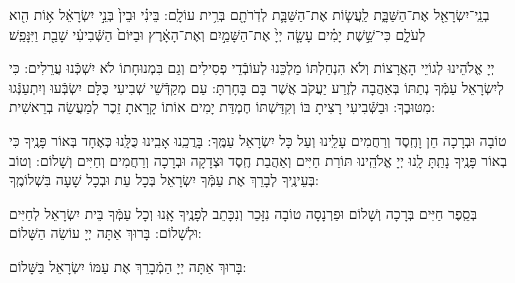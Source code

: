 \documentclass[twoside, openany, parskip=half, 11pt]{book}
\begin{document}
\nextpage
 
  בְנֵֽי־יִשְׂרָאֵ֖ל אֶת־הַשַּׁבָּ֑ת לַֽעֲשׂ֧וֹת אֶת־הַשַּׁבָּ֛ת לְדֹֽרֹתָ֖ם בְּרִ֥ית עוֹלָֽם: בֵּינִ֗י וּבֵין֙ בְּנֵ֣י יִשְׂרָאֵ֔ל א֥וֹת הִ֖וא לְעֹלָ֑ם כִּי־שֵׁ֣שֶׁת יָמִ֗ים עָשָׂ֤ה יְיָ֙ אֶת־הַשָּׁמַ֣יִם וְאֶת־הָאָ֔רֶץ וּבַיּוֹם֙ הַשְּֿׁבִיעִ֔י שָׁבַ֖ת וַיִּנָּפַֽשׁ׃
  
 יְיָ אֱלֹהֵינוּ לְגוֹיֵי הָאֲרָצוֹת וְלֹא הִנְחַלְתּוֹ מַלְכֵּנוּ לְעוֹבְֿדֵי פְסִילִים וְגַם בִּמְנוּחָתוֹ לֹא יִשְׁכְּֿנוּ עֲרֵלִים: כִּי לְיִשְׂרָאֵל עַמְּֿךָ נְתַתּוֹ בְּאַהֲבָה לְזֶרַע יַעֲקֹב אֲשֶׁר בָּם בָּחָרְתָּ: עַם מְקַדְּֿשֵׁי שְׁבִיעִי כֻּלָּם יִשְׂבְּֿעוּ וְיִתְעַנְּֿגוּ מִטּוּבֶךָ: וּבַשְּֿׁבִיעִי רָצִיתָ בּוֹ וְקִדַּשְׁתּוֹ חֶמְדַּת יָמִים אוֹתוֹ קָרָאתָ זֵכֶר לְמַעֲשֵׂה בְרֵאשִׁית:
  
\shabboskiddushhayom

\retzeh

\yaalehveyavo

\zion

\modim

\shabboschanukah

\shabboshodos  


\newcommand{\shabbossimshalom}{
\firstword{שִׂים שָׁלוֹם}
 טוֹבָה וּבְרָכָה חֵן וָחֶֽסֶד וְרַחֲמִים עָלֵֽינוּ וְעַל כָּל יִשְׂרָאֵל עַמֶּֽךָ: בָּרֲכֵֽנוּ אָבִֽינוּ כֻּלָּֽנוּ כְּאֶחָד בְּאוֹר פָּנֶֽיךָ כִּי בְאוֹר פָּנֶֽיךָ נָתַֽתָּ לָֽנוּ יְיָ אֱלֹהֵֽינוּ תּוֹרַת חַיִּים וְאַהֲבַת חֶֽסֶד וּצְדָקָה וּבְרָכָה וְרַחֲמִים וְחַיִּים וְשָׁלוֹם: וְטוֹב בְּעֵינֶֽיךָ לְבָרֵךְ אֶת עַמְּֿךָ יִשְׂרָאֵל בְּכָל עֵת וּבְכָל שָׁעָה בִּשְׁלוֹמֶֽךָ:

\vspace{-0.4\baselineskip}

\columnratio{0.7}
\begin{paracol}{2}

\instruction{בשבת שובה:}
\begin{small}
 בְּסֵֽפֶר חַיִּים בְּרָכָה וְשָׁלוֹם וּפַרְנָסָה טוֹבָה נִזָּכֵר וְנִכָּתֵב לְפָנֶֽיךָ אָֽנוּ וְכָל עַמְּֿךָ בֵּית יִשְׂרָאֵל לְחַיִּים וּלְשָׁלוֹם: בָּרוּךְ אַתָּה יְיָ עוֹשֵׂה הַשָּׁלוֹם:

\end{small}
\switchcolumn
בָּרוּךְ אַתָּה יְיָ הַמְֿבָרֵךְ אֶת עַמּוֹ יִשְׂרָאֵל בַּשָּׁלוֹם:
\end{paracol}
}

\shabbossimshalom
\end{document}
